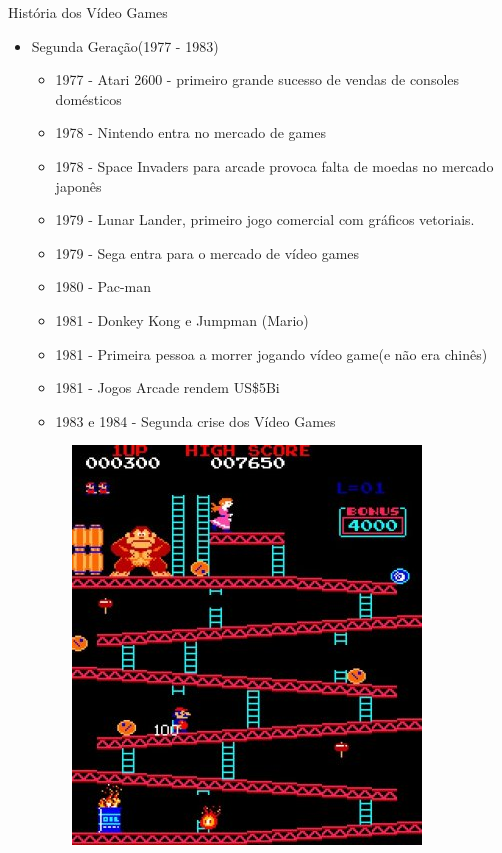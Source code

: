 \documentclass[xcolor=svgnames,handout]{beamer}
\begin{document}
\begin{frame}{História dos Vídeo Games}
\begin{itemize}
	\item Segunda Geração(1977 - 1983)\pause
	\begin{itemize}
	\item 1977 - Atari 2600 - primeiro grande sucesso de vendas de consoles domésticos\pause
	\item 1978 - Nintendo entra no mercado de games\pause
	\item 1978 - Space Invaders para arcade provoca falta de moedas no mercado japonês\pause
	\item 1979 - Lunar Lander, primeiro jogo comercial com gráficos vetoriais.\pause
	\item 1979 - Sega entra para o mercado de vídeo games\pause
	\item 1980 - Pac-man\pause
	\item 1981 - Donkey Kong e Jumpman (Mario)\pause
	\item 1981 - Primeira pessoa a morrer jogando vídeo game(e não era chinês)\pause
	\item 1981 - Jogos Arcade rendem US\$5Bi\pause
	\item 1983 e 1984 - Segunda crise dos Vídeo Games
	\end{itemize}
		\begin{figure}[t]
	    \centering
		    \includegraphics[scale=0.1]{imagens/mario}
		\end{figure}
\end{itemize}
\end{frame}
\end{document}
